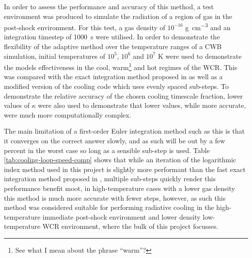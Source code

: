 In order to assess the performance and accuracy of this method, a test environment was produced to simulate the radiation of a region of gas in the post-shock environment.
For this test, a gas density of $10^{-16}$ \si{\gram\per\centi\metre\cubed} and an integration timestep of \SI{1000}{\second} were utilised.
In order to demonstrate the flexibility of the adaptive method over the temperature ranges of a CWB simulation, initial temperatures of $10^5$, $10^6$ and $10^7$ \si{\kelvin} were used to demonstrate the models effectiveness in the cool, warm\footnote{See what I mean about the phrase ``warm''?} and hot regimes of the WCR.
This was compared with the exact integration method proposed in \cite{townsendExactIntegrationScheme2009} as well as a modified version of the cooling code which uses evenly spaced sub-steps. To demonstrate the relative accuracy of the chosen cooling timescale fraction, lower values of $\kappa$ were also used to demonstrate that lower values, while more accurate, were much more computationally complex.


The main limitation of a first-order Euler integration method such as this is that it converges on the correct answer slowly, and as such will be out by a few percent in the worst case so long as a sensible sub-step is used.
Table \ref{tab:cooling-loop-speed-comp} shows that while an iteration of the logarithmic index method used in this project is slightly more performant than the fast exact integration method proposed in \cite{townsendExactIntegrationScheme2009}, multiple sub-steps quickly render this performance benefit moot, in high-temperature cases with a lower gas density this method is much more accurate with fewer steps, however, as such this method was considered suitable for performing radiative cooling in the high-temperature immediate post-shock environment and lower density low-temperature WCR environment, where the bulk of this project focusses.


